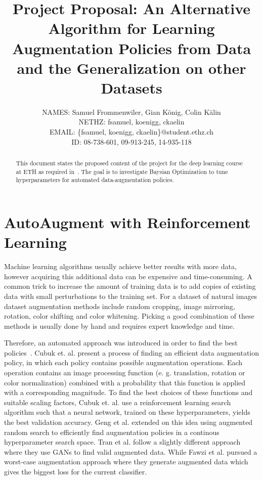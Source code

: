 \documentclass[10pt,twocolumn,letterpaper]{article}
\begin{document}
\title{Project Proposal: An Alternative Algorithm for Learning Augmentation Policies from Data and the Generalization on other Datasets}

\author{
    	\small{NAMES: Samuel Frommenwiler, Gian K\"onig, Colin K\"alin} \\
   	\small{NETHZ: fsamuel, koenigg, ckaelin}\\
	\small{EMAIL: \{fsamuel, koenigg, ckaelin\}$@$student.ethz.ch}\\
    	\small{ID: 08-738-601, 09-913-245, 14-935-118}
}

\maketitle

\begin{abstract}
   This document states the proposed content of the project for the deep learning course at ETH as required in~\cite{DL18}. The goal is to investigate Baysian Optimization to tune hyperparameters for automated data-augmentation policies.
\end{abstract}

\section{AutoAugment with Reinforcement Learning}
Machine learning algorithms usually achieve better results with more data, however acquiring this additional data can be expensive and time-consuming.  A common trick to increase the amount of training data is to add copies of existing data with small perturbations to the training set. For a dataset of natural images dataset augmentation methods include random cropping, image mirroring, rotation, color shifting and color whitening. Picking a good combination of these methods is usually done by hand and requires expert knowledge and time.
\par
  Therefore, an automated approach was introduced in order to find the best policies~\cite{Ekin}. Cubuk et. al. present a process of finding an efficient data augmentation policy, in which each policy contains possible augmentation operations. Each operation contains an image processing function (e. g. translation, rotation or color normalization) combined with a probability that this function is applied with a corresponding magnitude. To find the best choices of these functions and suitable scaling factors, Cubuk et. al. use a reinforcement learning search algorithm such that a neural network, trained on these hyperparameters, yields the best validation accuracy.
  Geng et al. \cite{DBLP:journals/corr/abs-1811-04768} extended on this idea using augmented random search to efficiently find augmentation policies in a continous hyperparameter search space.
  Tran et al. \cite{DBLP:journals/corr/abs-1710-10564} follow a slightly different approach where they use GANs to find valid augmented data. While Fawzi et al. \cite{Fawzi} pursued a worst-case augmentation approach where they generate augmented data which gives the biggest loss for the current classifier.
\end{document}
